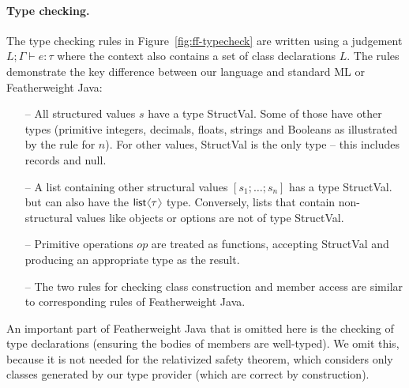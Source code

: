 \documentclass[preprint]{sigplanconf}
\newcommand{\langl}{\begin{picture}(4.5,7)
\put(1.1,2.5){\rotatebox{60}{\line(1,0){5.5}}}
\put(1.1,2.5){\rotatebox{300}{\line(1,0){5.5}}}
\end{picture}}
\newcommand{\rangl}{\begin{picture}(4.5,7)
\put(.9,2.5){\rotatebox{120}{\line(1,0){5.5}}}
\put(.9,2.5){\rotatebox{240}{\line(1,0){5.5}}}
\end{picture}}
\newcommand{\kvd}[1]{\textnormal{\textcolor{kvdclr}{\sffamily #1}}}
\newcommand{\ident}[1]{\textnormal{\sffamily #1}}
\begin{document}
\paragraph{Type checking.} 
The type checking rules in Figure~\ref{fig:ff-typecheck} are written using a judgement
$L; \Gamma \vdash e : \tau$ where the context also contains a set of class declarations $L$.
The rules demonstrate the key difference between our language and standard ML or Featherweight Java:
%
\begin{itemize}[noitemsep]
\item[--] All structured values $s$ have a type \ident{StructVal}. Some of those have other types
  (primitive integers, decimals, floats, strings and Booleans as illustrated by the rule for $n$).
  For other values, \ident{StructVal} is the only type -- this includes records and \kvd{null}.
\item[--] A list containing other structural values $[s_1; \ldots; s_n]$ has a type \ident{StructVal}.  
  but can also have the $\ident{list}\langl\tau\rangl$ type. Conversely, lists that contain
  non-structural values like objects or options are not of type \ident{StructVal}.
\item[--] Primitive operations $op$ are treated as functions, accepting \ident{StructVal} and producing
  an appropriate type as the result.
\item[--] The two rules for checking class construction and member access are similar to corresponding
  rules of Featherweight Java.  
\end{itemize}
%
An important part of Featherweight Java that is omitted here is the checking of type declarations
(ensuring the bodies of members are well-typed). We omit this, because it is not needed for the
relativized safety theorem, which considers only classes generated by our type provider (which 
are correct by construction).

\end{document}

